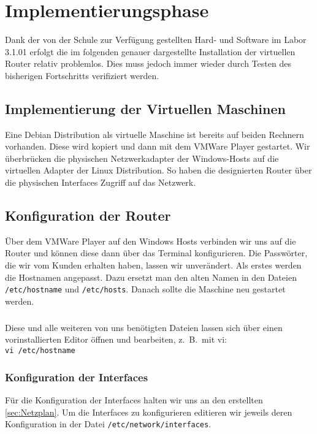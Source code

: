 \section{Implementierungsphase} 
\label{sec:Implementierungsphase}

Dank der von der Schule zur Verfügung gestellten Hard- und Software im Labor 3.1.01 erfolgt die im folgenden genauer dargestellte Installation der virtuellen Router relativ problemlos. Dies muss jedoch immer wieder durch Testen des bisherigen Fortschritts verifiziert werden. 

\subsection{Implementierung der Virtuellen Maschinen}
\label{subsec:ImplementierungVMs}
Eine Debian Distribution als virtuelle Maschine ist bereits auf beiden Rechnern vorhanden. Diese wird kopiert und dann mit dem VMWare Player gestartet. Wir überbrücken die physischen Netzwerkadapter der Windows-Hosts auf die virtuellen Adapter der Linux Distribution. So haben die designierten Router über die physischen Interfaces Zugriff auf das Netzwerk. 

\subsection{Konfiguration der Router}
\label{subsec:KonfigurationRouter}

Über dem VMWare Player auf den Windows Hosts verbinden wir uns auf die Router und können diese dann über das Terminal konfigurieren. Die Passwörter, die wir vom Kunden erhalten haben, lassen wir unverändert. Als erstes werden die Hostnamen angepasst. Dazu ersetzt man den alten Namen in den Dateien \texttt{/etc/hostname} und \texttt{/etc/hosts}. Danach sollte die Maschine neu gestartet werden.
\subparagraph*{} Diese und alle weiteren von uns benötigten Dateien lassen sich über einen vorinstallierten Editor öffnen und bearbeiten, z.\ B.\ mit vi:\\
\noindent\hspace*{42mm} \texttt{vi /etc/hostname}

\subsubsection{Konfiguration der Interfaces}
\label{subsubsec:KonfigurationInsideRouterInt}
Für die Konfiguration der Interfaces halten wir uns an den erstellten \ref{sec:Netzplan}. Um die Interfaces zu konfigurieren editieren wir jeweils deren Konfiguration in der Datei \texttt{/etc/network/interfaces}.

